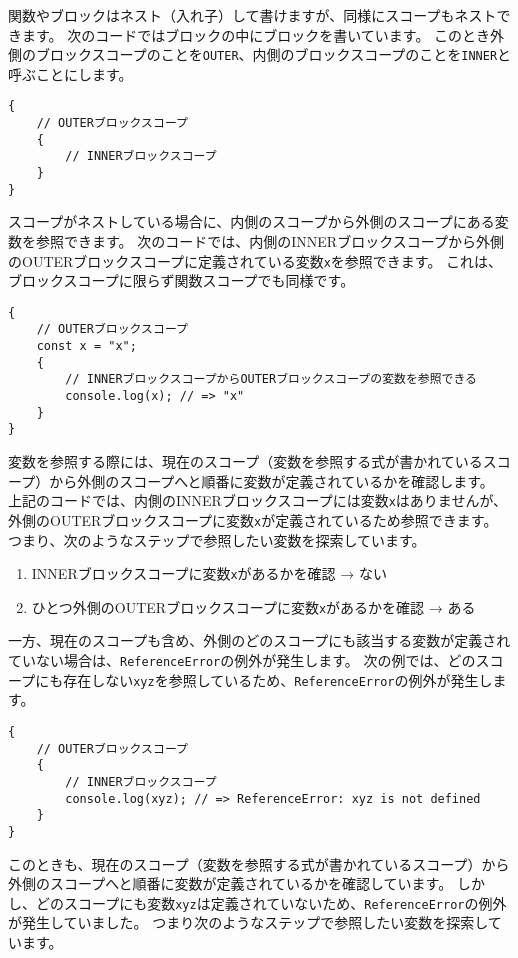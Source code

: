 関数やブロックはネスト（入れ子）して書けますが、同様にスコープもネストできます。
次のコードではブロックの中にブロックを書いています。
このとき外側のブロックスコープのことを\texttt{OUTER}、内側のブロックスコープのことを\texttt{INNER}と呼ぶことにします。

\begin{lstlisting}
{
    // OUTERブロックスコープ
    {
        // INNERブロックスコープ
    }
}
\end{lstlisting}

スコープがネストしている場合に、内側のスコープから外側のスコープにある変数を参照できます。
次のコードでは、内側のINNERブロックスコープから外側のOUTERブロックスコープに定義されている変数\texttt{x}を参照できます。
これは、ブロックスコープに限らず関数スコープでも同様です。

\begin{lstlisting}
{
    // OUTERブロックスコープ
    const x = "x";
    {
        // INNERブロックスコープからOUTERブロックスコープの変数を参照できる
        console.log(x); // => "x"
    }
}
\end{lstlisting}

変数を参照する際には、現在のスコープ（変数を参照する式が書かれているスコープ）から外側のスコープへと順番に変数が定義されているかを確認します。
上記のコードでは、内側のINNERブロックスコープには変数\texttt{x}はありませんが、外側のOUTERブロックスコープに変数\texttt{x}が定義されているため参照できます。
つまり、次のようなステップで参照したい変数を探索しています。

\begin{enumerate}
\def\labelenumi{\arabic{enumi}.}
\item
  INNERブロックスコープに変数\texttt{x}があるかを確認 → ない
\item
  ひとつ外側のOUTERブロックスコープに変数\texttt{x}があるかを確認 → ある
\end{enumerate}

一方、現在のスコープも含め、外側のどのスコープにも該当する変数が定義されていない場合は、\texttt{ReferenceError}の例外が発生します。
次の例では、どのスコープにも存在しない\texttt{xyz}を参照しているため、\texttt{ReferenceError}の例外が発生します。
\newpage
\begin{lstlisting}
{
    // OUTERブロックスコープ
    {
        // INNERブロックスコープ
        console.log(xyz); // => ReferenceError: xyz is not defined
    }
}
\end{lstlisting}

このときも、現在のスコープ（変数を参照する式が書かれているスコープ）から外側のスコープへと順番に変数が定義されているかを確認しています。
しかし、どのスコープにも変数\texttt{xyz}は定義されていないため、\texttt{ReferenceError}の例外が発生していました。
つまり次のようなステップで参照したい変数を探索しています。

